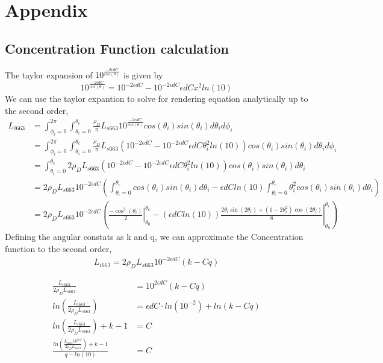 \documentclass{article}
\begin{document}
\section{Appendix}
\subsection{Concentration Function calculation}
The taylor expansion of $ 10^{\frac{-2\epsilon d C}{cos(\theta)}}$ is given by
$$ 10^{\frac{-2\epsilon d C}{ cos(\theta)}} = 10^{-2\epsilon d C} - 10^{-2\epsilon d C}\epsilon d C x^2ln(10)$$
We can use the taylor expantion to solve for rendering equation analytically up to the second order,
\begin{align*}
  L_{i 663} &= \int^{2\pi}_{\phi_i = 0}\int^{\theta_c}_{\theta_i = 0}
  \frac{\rho_D}{\pi}  L_{s 663} 10^\frac{-2\epsilon d C}{cos(\theta)}cos(\theta_i)sin(\theta_i)d\theta_i d\phi_i
      \\    &=  \int^{2\pi}_{\phi_i = 0}\int^{\theta_c}_{\theta_i = 0}
      \frac{\rho_D}{\pi}  L_{s 663}\left(10^{-2\epsilon d C} - 10^{-2\epsilon d C}\epsilon d C \theta_i^2ln(10)\right)
      cos(\theta_i)sin(\theta_i)d\theta_i d\phi_i
      \\    &= \int^{\theta_c}_{\theta_i = 0}
      2\rho_D  L_{s 663}\left(10^{-2\epsilon d C} - 10^{-2\epsilon d C}\epsilon d C \theta_i^2ln(10)\right)
      cos(\theta_i)sin(\theta_i)d\theta_i
      \\ &= 2\rho_D  L_{s 663}10^{-2\epsilon d C} \left(
      \int^{\theta_c}_{\theta_i = 0}cos(\theta_i)sin(\theta_i)d\theta_i-\epsilon d C ln(10)\int^{\theta_c}_{\theta_i = 0} \theta_i^2 cos(\theta_i)sin(\theta_i)d\theta_i
      \right)
      \\&= 2\rho_D  L_{s 663}10^{-2\epsilon d C} \left(\left. \frac{-\cos^2(\theta_i)}{2}\right \rvert^{\theta_c}_{\theta_0} - \left.
      \left(\epsilon d C ln(10)\right)\frac{2\theta_i\sin\left(2\theta_i\right)+\left(1-2\theta_i^2\right)\cos\left(2\theta_i\right)}{8} \right \rvert^{\theta_c}_{\theta_0}
      \right)
\end{align*}
Defining the angular constats as k and q, we can approximate the Concentration function to the second order,
\begin{align*}
L_{i 663} = 2\rho_D  L_{s 663}10^{-2\epsilon d C} (k - Cq)
\end{align*}

\begin{align*}
\frac{L_{i 663}}{2\rho_D  L_{s 663}} &= 10^{2\epsilon d C}(k - Cq)\\
ln \left( \frac{L_{i 663} }{2\rho_D  L_{s 663}} \right ) &= \epsilon d C\cdot ln(10^{-2})+ln(k - Cq) \\
ln \left( \frac{L_{i 663} }{2\rho_D  L_{s 663}} \right ) +k -1 &= C \\
\frac{ln \left( \frac{L_{i 663} 10^{2\epsilon d} }{2\rho_D  L_{s 663}} \right ) +k -1}{q - ln(10)} &= C
\end{align*}
\end{document}
